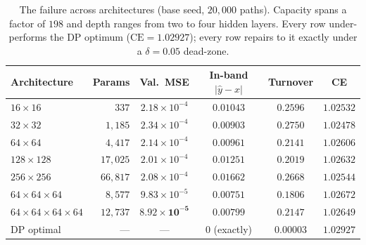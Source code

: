 \documentclass[11pt]{article}
\begin{document}
\begin{table}[t]
\centering
\caption{The failure across architectures (base seed, $20{,}000$ paths). Capacity
spans a factor of $198$ and depth ranges from two to four hidden layers. Every
row under-performs the DP optimum ($\mathrm{CE}=1.02927$); every row repairs to
it exactly under a $\delta=0.05$ dead-zone.}
\label{tab:robustness}
\small
\begin{tabular}{lrcccc}
\toprule
Architecture & Params & Val.\ MSE & In-band $|\hat y-x|$ & Turnover & CE\\
\midrule
$16\times16$    & $337$    & $2.18\!\times\!10^{-4}$ & $0.01043$ & $0.2596$ & $1.02532$\\
$32\times32$    & $1{,}185$ & $2.34\!\times\!10^{-4}$ & $0.00903$ & $0.2750$ & $1.02478$\\
$64\times64$    & $4{,}417$ & $2.14\!\times\!10^{-4}$ & $0.00961$ & $0.2141$ & $1.02606$\\
$128\times128$  & $17{,}025$ & $2.01\!\times\!10^{-4}$ & $0.01251$ & $0.2019$ & $1.02632$\\
$256\times256$  & $66{,}817$ & $2.08\!\times\!10^{-4}$ & $\mathbf{0.01662}$ & $0.2668$ & $1.02544$\\
$64\times64\times64$ & $8{,}577$ & $9.83\!\times\!10^{-5}$ & $0.00751$ & $0.1806$ & $1.02672$\\
$64\times64\times64\times64$ & $12{,}737$ & $\mathbf{8.92\!\times\!10^{-5}}$ & $0.00799$ & $0.2147$ & $1.02649$\\
\midrule
DP optimal & --- & --- & $0$ (exactly) & $0.00003$ & $\mathbf{1.02927}$\\
\bottomrule
\end{tabular}
\end{table}
\end{document}
